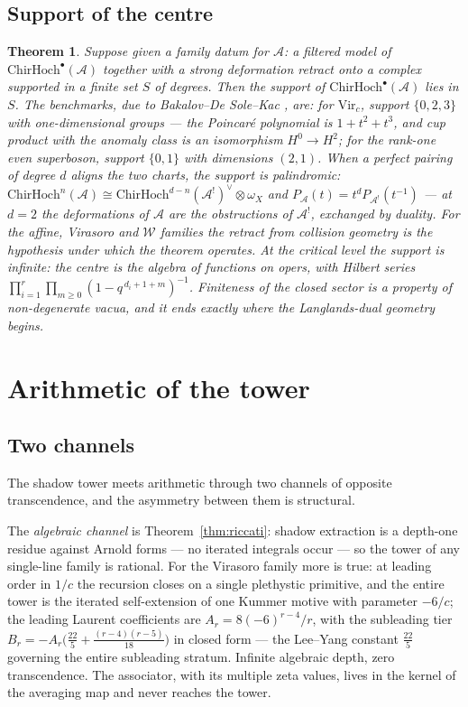 \documentclass[11pt]{amsart}
\numberwithin{equation}{section}
\theoremstyle{plain}
\newtheorem{theorem}{Theorem}[section]
\theoremstyle{definition}
\theoremstyle{remark}
\newcommand{\cA}{\mathcal{A}}
\newcommand{\cW}{\mathcal{W}}
\newcommand{\Vir}{\mathrm{Vir}}
\newcommand{\ChirHoch}{\mathrm{ChirHoch}}
\begin{document}
\subsection{Support of the centre}

\begin{theorem}\label{thm:H}
Suppose given a family datum for $\cA$: a filtered model of
$\ChirHoch^{\bullet}(\cA)$ together with a strong deformation retract
onto a complex supported in a finite set $S$ of degrees. Then the
support of $\ChirHoch^{\bullet}(\cA)$ lies in $S$. The benchmarks, due
to Bakalov--De Sole--Kac \cite{BDSK}, are: for $\Vir_c$, support
$\{0,2,3\}$ with one-dimensional groups --- the Poincar\'e polynomial is
$1+t^{2}+t^{3}$, and cup product with the anomaly class is an
isomorphism $H^{0}\to H^{2}$; for the rank-one even superboson, support
$\{0,1\}$ with dimensions $(2,1)$. When a perfect pairing of degree $d$ aligns
the two charts, the support is palindromic:
$\ChirHoch^{n}(\cA)\cong\ChirHoch^{d-n}(\cA^{!})^{\vee}\otimes\omega_X$
and $P_{\cA}(t)=t^{d}P_{\cA^{!}}(t^{-1})$ --- at $d=2$ the
deformations of $\cA$ are the obstructions of $\cA^{!}$, exchanged by
duality. For the affine, Virasoro and
$\cW$ families the retract from collision geometry is the hypothesis
under which the theorem operates. At the critical level the support is
infinite: the centre is the algebra of functions on opers, with
Hilbert series
$\prod_{i=1}^{r}\prod_{m\geq0}(1-q^{\,d_i+1+m})^{-1}$. Finiteness of
the closed sector is a property of non-degenerate vacua, and it ends
exactly where the Langlands-dual geometry begins.
\end{theorem}

\section{Arithmetic of the tower}\label{sec:arithmetic}

\subsection{Two channels}

The shadow tower meets arithmetic through two channels of opposite
transcendence, and the asymmetry between them is structural.

The \emph{algebraic channel} is Theorem~\ref{thm:riccati}: shadow
extraction is a depth-one residue against Arnold forms --- no iterated
integrals occur --- so the tower of any single-line family is rational.
For the Virasoro family more is true: at leading order in $1/c$ the
recursion closes on a single plethystic primitive, and the entire tower
is the iterated self-extension of one Kummer motive with parameter
$-6/c$; the leading Laurent coefficients are
$A_r=8(-6)^{r-4}/r$, with the subleading tier
$B_r=-A_r\bigl(\tfrac{22}{5}+\tfrac{(r-4)(r-5)}{18}\bigr)$ in closed
form --- the Lee--Yang constant $\tfrac{22}{5}$ governing the entire
subleading stratum. Infinite algebraic depth, zero transcendence. The
associator, with its multiple zeta values, lives in the kernel of the
averaging map and never reaches the tower.
\end{document}
